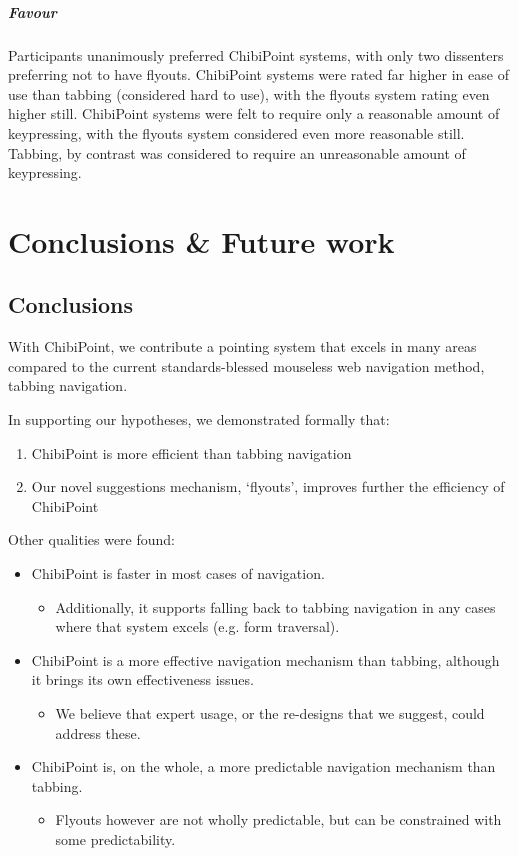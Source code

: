 \documentclass[a4paper, 12pt]{report}
\begin{document}
\paragraph{Favour}
Participants unanimously preferred ChibiPoint systems, with only two dissenters preferring not to have flyouts. ChibiPoint systems were rated far higher in ease of use than tabbing (considered hard to use), with the flyouts system rating even higher still. ChibiPoint systems were felt to require only a reasonable amount of keypressing, with the flyouts system considered even more reasonable still. Tabbing, by contrast was considered to require an unreasonable amount of keypressing.

\chapter{Conclusions \& Future work}
\label{chap:conclusions}
\section{Conclusions}
With ChibiPoint, we contribute a pointing system that excels in many areas compared to the current standards-blessed mouseless web navigation method, tabbing navigation.

In supporting our hypotheses, we demonstrated formally that:
\begin{enumerate}
	\item ChibiPoint is more efficient than tabbing navigation
	\item Our novel suggestions mechanism, `flyouts', improves further the efficiency of ChibiPoint
\end{enumerate}

Other qualities were found:

\begin{itemize}
\item ChibiPoint is faster in most cases of navigation.
	\begin{itemize}
	\item Additionally, it supports falling back to tabbing navigation in any cases where that system excels (e.g. form traversal).
	\end{itemize}
\item ChibiPoint is a more effective navigation mechanism than tabbing, although it brings its own effectiveness issues.
	\begin{itemize}
	\item We believe that expert usage, or the re-designs that we suggest, could address these.
	\end{itemize}
\item ChibiPoint is, on the whole, a more predictable navigation mechanism than tabbing.
	\begin{itemize}
	\item Flyouts however are not wholly predictable, but can be constrained with some predictability.
	\end{itemize}
\end{itemize}
\end{document}
